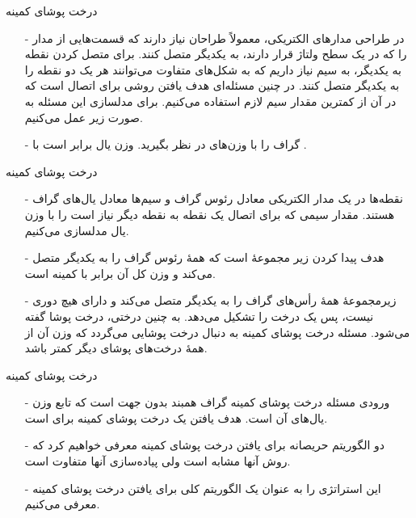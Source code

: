 
\begin{frame}{‌درخت پوشای کمینه}
\begin{itemize}\itemr
\item[-]
در طراحی مدارهای الکتریکی، معمولاً طراحان نیاز دارند که قسمت‌هایی از مدار را که در یک سطح ولتاژ قرار دارند، به یکدیگر متصل کنند. برای متصل کردن
نقطه به یکدیگر، به
سیم نیاز داریم که به شکل‌های متفاوت می‌توانند هر یک  دو نقطه را به یکدیگر متصل کنند. در چنین مسئله‌ای هدف یافتن روشی برای اتصال است که در آن از کمترین مقدار سیم لازم استفاده می‌کنیم. برای مدلسازی این مسئله به صورت زیر عمل می‌کنیم.
\item[-]
گراف
را با وزن‌های
در نظر بگیرید. وزن یال
برابر است با
 .
\end{itemize}
\end{frame}


\begin{frame}{‌درخت پوشای کمینه}
\begin{itemize}\itemr
\item[-]
نقطه‌ها در یک مدار الکتریکی معادل رئوس گراف و سیم‌ها معادل یال‌های گراف هستند. مقدار سیمی که برای اتصال یک نقطه به نقطه دیگر نیاز است را با وزن یال مدلسازی می‌کنیم.
\item[-]
هدف پیدا کردن زیر مجموعهٔ
است که همهٔ رئوس گراف را به یکدیگر متصل می‌کند و وزن کل آن برابر با
کمینه است.
\item[-]
زیرمجموعهٔ
همهٔ رأس‌های گراف را به یکدیگر متصل می‌کند و دارای هیچ دوری نیست، پس یک درخت را تشکیل می‌دهد. به چنین درختی، درخت پوشا
گفته می‌شود. مسئله درخت پوشای کمینه
به دنبال درخت پوشایی می‌گردد که وزن آن از همهٔ درخت‌های پوشای دیگر کمتر باشد.
\end{itemize}
\end{frame}


\begin{frame}{‌درخت پوشای کمینه}
\begin{itemize}\itemr
\item[-]
ورودی مسئله درخت پوشای کمینه گراف همبند بدون جهت
است که تابع وزن یال‌های آن
است. هدف یافتن یک درخت پوشای کمینه برای
است.
\item[-]
دو الگوریتم حریصانه برای یافتن درخت پوشای کمینه معرفی خواهیم کرد که روش آنها مشابه است ولی پیاده‌سازی آنها متفاوت است.
\item[-]
این استراتژی را به عنوان یک الگوریتم کلی برای یافتن درخت پوشای کمینه معرفی می‌کنیم.
\end{itemize}
\end{frame}


